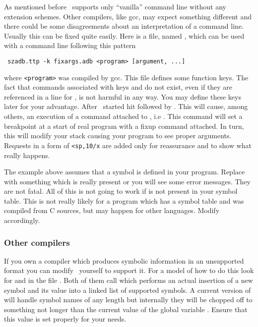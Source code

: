 As mentioned before \szadb\ supports only ``vanilla'' command line
without any extension schemes.  Other compilers, like gcc,
may expect something different and there could be some disagreements
about an interpretation of a command line.  Usually this can be
fixed quite easily.  Here is a file, named ,
which can be used with a command line following this pattern
\begin{exmpl}
	\verb? szadb.ttp -k fixargs.adb <program> [argument, ...]?
\end{exmpl}
where \verb?<program>?  was compiled by gcc.
This file defines some function keys.  The fact that commands
associated with keys  and  do not exist,
even if they are referenced in a line for , is not
harmful in any way.
You may
define these keys later for your advantage.  After \szadb\ started
hit  followed by .  This will cause,
among others, an execution of a command attached to ,
i.e . This command will set a breakpoint at
a start of real program with a fixup command attached.
In turn, this will modify your stack causing your program to
see proper arguments.  Requests in a form of \verb?<sp,10/x?
are added only for reassurance and to show what really happens.

The example above assumes that a symbol  is defined
in your program.  Replace with something which is really present
or you will see some error messages.  They are not fatal.
All of this is not going to work if  is not present
in your symbol table.  This is not really likely for a program
which has a symbol table and was compiled from C sources, but
may happen for other languages.  Modify accordingly.


\subsubsection{Other compilers}

If you own a compiler which produces symbolic information in an
unsupported format you can modify \szadb\ yourself to support it.  For
a model of how to do this look for  and
 in the file .  Both of them call
 which performs an actual insertion of a new symbol and
its value into a linked list of supported symbols.  A current version
of  will handle symbol names of any length but internally they
will be chopped off to something not longer than the current value of
the global variable .  Ensure that this value is set properly
for your needs.

